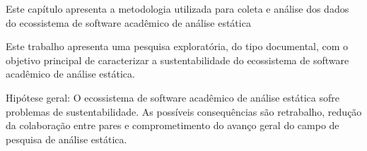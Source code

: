 {Este capítulo apresenta a metodologia utilizada para coleta e análise dos
dados do ecossistema de software acadêmico de análise estática}
\label{metodologia}

Este trabalho apresenta uma pesquisa exploratória, 
do tipo documental, com o objetivo principal de 
caracterizar a sustentabilidade
do ecossistema de software acadêmico de análise estática.

Hipótese geral: O ecossistema de software acadêmico de análise
estática sofre %
problemas de sustentabilidade. 
As possíveis consequências são retrabalho,
redução da colaboração entre pares e 
comprometimento do avanço geral do campo de pesquisa de
análise estática.










